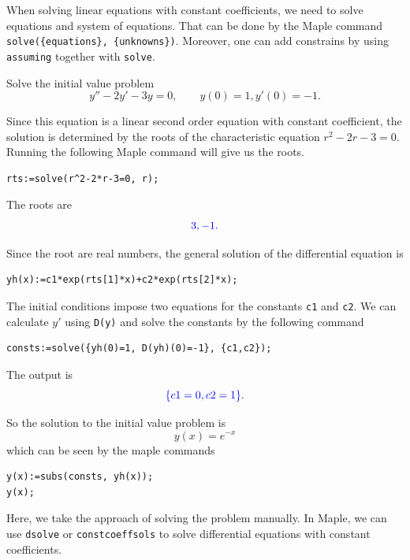 \documentclass[
  12pt]{elegantbook}
\begin{document}
When solving linear equations with constant coefficients, we need to solve equations and system of equations. That can be done by the Maple command \texttt{solve(\{equations\},\ \{unknowns\})}. Moreover, one can add constrains by using \texttt{assuming} together with \texttt{solve}.

\begin{example}
Solve the initial value problem
\[y''-2y'-3y=0,\qquad y(0)=1, y'(0)=-1.\]
\end{example}

\begin{solution}

Since this equation is a linear second order equation with constant coefficient, the solution is determined by the roots of the characteristic equation \(r^2-2r-3=0\). Running the following Maple command will give us the roots.

\begin{verbatim}
rts:=solve(r^2-2*r-3=0, r);
\end{verbatim}

The roots are
\[\color{blue}{3, -1}.\]

Since the root are real numbers, the general solution of the differential equation is

\begin{verbatim}
yh(x):=c1*exp(rts[1]*x)+c2*exp(rts[2]*x);
\end{verbatim}

The initial conditions impose two equations for the constants \texttt{c1} and \texttt{c2}. We can calculate \(y'\) using \texttt{D(y)} and solve the constants by the following command

\begin{verbatim}
consts:=solve({yh(0)=1, D(yh)(0)=-1}, {c1,c2});
\end{verbatim}

The output is
\[\color{blue}{\{{c1} = 0, {c2} = 1\}}.\]

So the solution to the initial value problem is
\[y(x)=e^{-x}\]
which can be seen by the maple commands

\begin{verbatim}
y(x):=subs(consts, yh(x));
y(x);
\end{verbatim}

\end{solution}

Here, we take the approach of solving the problem manually. In Maple, we can use \texttt{dsolve} or \texttt{constcoeffsols} to solve differential equations with constant coefficients.
\end{document}
